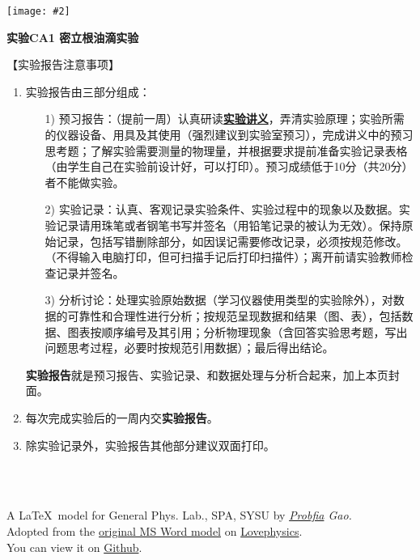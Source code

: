 \documentclass[11pt,a4paper]{ctexart}
\newcommand{\ExpeName}{实验CA1 密立根油滴实验}
\newcommand{\cpic}[2]{
\begin{center}
\texttt{[image: \#2]}
\end{center}
}
\begin{document}
\cpic{0.255}{e1}%
\begin{center}
\LARGE\textbf{{\ExpeName}}
\end{center}
\large{【实验报告注意事项】}
\begin{enumerate}
 \item 实验报告由三部分组成：
 \begin{enumerate}
  \item[1)]预习报告：（提前一周）认真研读\textbf{\uline{实验讲义}}，弄清实验原理；实验所需的仪器设备、用具及其使用（强烈建议到实验室预习），完成讲义中的预习思考题；了解实验需要测量的物理量，并根据要求提前准备实验记录表格（由学生自己在实验前设计好，可以打印）。预习成绩低于10分（共20分）者不能做实验。
  \item[2)]实验记录：认真、客观记录实验条件、实验过程中的现象以及数据。实验记录请用珠笔或者钢笔书写并签名（{\color{red}用铅笔记录的被认为无效}）。{\color{red}保持原始记录，包括写错删除部分，如因误记需要修改记录，必须按规范修改。}（不得输入电脑打印，但可扫描手记后打印扫描件）；离开前请实验教师检查记录并签名。
  \item[3)]分析讨论：处理实验原始数据（学习仪器使用类型的实验除外），对数据的可靠性和合理性进行分析；按规范呈现数据和结果（图、表），包括数据、图表按顺序编号及其引用；分析物理现象（含回答实验思考题，写出问题思考过程，必要时按规范引用数据）；最后得出结论。
 \end{enumerate}
 \textbf{实验报告}就是预习报告、实验记录、和数据处理与分析合起来，加上本页封面。
 \item 每次完成实验后的一周内交\textbf{实验报告}。
 \item 除实验记录外，实验报告其他部分建议双面打印。
\end{enumerate}
\ 
\\
\ 

\begin{flushright}                                                           %
\tiny{
A \LaTeX \ model for General Phys. Lab., SPA, SYSU by {\em \href{https://www.weibo.com/3532532974/profile?rightmod=1&wvr=6&mod=personinfo&is_all=1}{Probfia} Gao.}\\ Adopted from the \href{http://lovephysics.sysu.edu.cn/lib/exe/fetch.php?media=courses:secondlevelzhuhai:report.docx}{original MS Word model} on \href{http://lovephysics.sysu.edu.cn}{Lovephysics}.\\ You can view it on \href{https://github.com/Probfia/SYSU_GPL_C}{Github}.}
\end{flushright}
\end{document}

